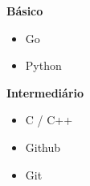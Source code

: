 \documentclass[10pt,a4paper,ragged2e]{altacv}
\begin{document}
\divider





{}

{\Large \textbf{Básico}\par\par}
\vspace{5pt}
\begin{itemize}
    \item Go
    \item Python
\end{itemize}

{\Large \textbf{Intermediário}\par\par}
\vspace{5pt}
\begin{itemize}
    \item C / C++
    \item Github 
    \item Git 
\end{itemize}
\end{document}
